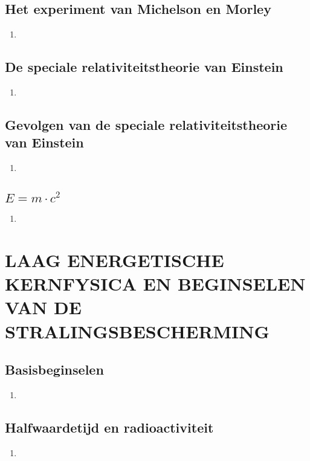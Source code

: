 \documentclass[12pt]{article}
\begin{document}
    \subsection{Het experiment van Michelson en Morley}
    \begin{enumerate}
        \item 
    \end{enumerate}
    \subsection{De speciale relativiteitstheorie van Einstein}
    \begin{enumerate}
        \item 
    \end{enumerate}
    \subsection{Gevolgen van de speciale relativiteitstheorie van Einstein}
    \begin{enumerate}
        \item 
    \end{enumerate}
    \subsection{$E=m \cdot c^2$}
    \begin{enumerate}
        \item 
    \end{enumerate}



    \section{LAAG ENERGETISCHE KERNFYSICA EN BEGINSELEN VAN DE STRALINGSBESCHERMING}
    \subsection{Basisbeginselen}
    \begin{enumerate}
        \item 
    \end{enumerate}
    \subsection{Halfwaardetijd en radioactiviteit}
    \begin{enumerate}
        \item 
    \end{enumerate}
\end{document}

